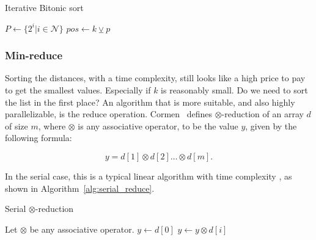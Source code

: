 \begin{algorithm}[ht]
\caption{Iterative Bitonic sort}
\label{alg:bitonic_sort}
\begin{algorithmic}
    \State $P \gets \{2^i|i \in \mathcal{N} \}$
                \State $pos \gets k \veebar p$ 
                     
                        \State {}
                    \EndIf
                        \State {}
                    \EndIf
                \EndIf
                \EndFor
            \EndFor
        \EndFor
    \EndFunction
    \Statex
    \State {}
    \EndIf
    \EndFunction
\end{algorithmic}
\end{algorithm}

\subsubsection{Min-reduce} %
\label{ssub:min_reduce}

Sorting the distances, with a  time complexity, still looks like a high price to pay to get the smallest values. Especially if $k$ is reasonably small. Do we need to sort the list in the first place? An algorithm that is more suitable, and also highly parallelizable, is the reduce operation. Cormen~\cite{Cormen:2001} defines $\otimes$-reduction of an array $d$ of size $m$, where $\otimes$ is any associative operator, to be the value $y$, given by the following formula:

     $$ y = d[1] \otimes d[2] \dots \otimes d[m].$$

In the serial case, this is a typical linear algorithm with time complexity , as shown in Algorithm~\ref{alg:serial_reduce}. 

\begin{algorithm}[ht]
\caption{Serial $\otimes$-reduction}
\label{alg:serial_reduce}
\begin{algorithmic}
    \State Let $\otimes$ be any associative operator.
        \State $y \gets d[0]$
            \State $y \gets y \otimes d[i]$
        \EndFor
    \EndFunction
\end{algorithmic}
\end{algorithm}

